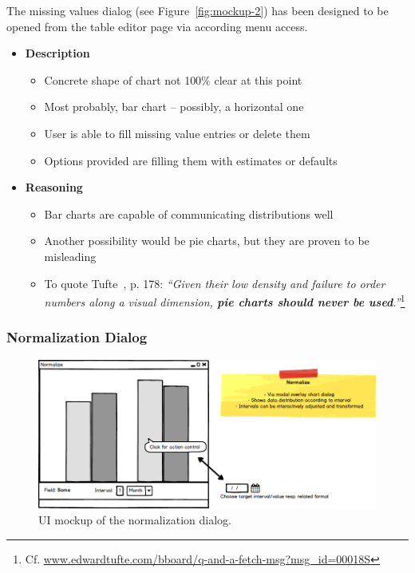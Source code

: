 The missing values dialog (see Figure~\ref{fig:mockup-2}) has been designed to be opened from the table editor page via according menu access.

\begin{itemize}
  \item \textbf{Description}
  \begin{itemize}
    \item Concrete shape of chart not 100\% clear at this point
    \item Most probably, bar chart -- possibly, a horizontal one
    \item User is able to fill missing value entries or delete them
    \item Options provided are filling them with estimates or defaults
  \end{itemize}
  \item \textbf{Reasoning}
  \begin{itemize}
    \item Bar charts are capable of communicating distributions well
    \item Another possibility would be pie charts, but they are proven to be misleading
    \item To quote Tufte~\cite{Tufte2001}, p. 178: \emph{``Given
  their low density and failure to order numbers along a
  visual dimension, \textbf{pie charts should never be used}.''}\footnote{Cf. \textcolor{blue}{\href{https://www.edwardtufte.com/bboard/q-and-a-fetch-msg?msg\_id=00018S}{www.edwardtufte.com/bboard/q-and-a-fetch-msg?msg\_id=00018S}}}
  \end{itemize}
\end{itemize}


\subsubsection{Normalization Dialog}

\begin{figure}[h]
  \centering
  \includegraphics[width=1.2\textwidth]{figures/design/mockup-3}
  \caption{UI mockup of the normalization dialog.}
  \label{fig:mockup-3}
\end{figure}

